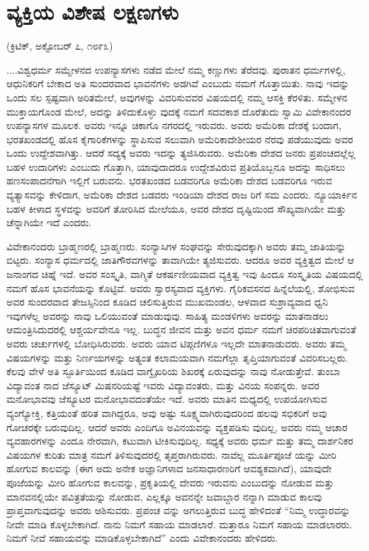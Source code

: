 \delimiter


\section{ವ್ಯಕ್ತಿಯ ವಿಶೇಷ ಲಕ್ಷಣಗಳು}

\begin{center}
(ಕ್ರಿಟಿಕ್​, ಅಕ್ಟೋಬರ್​ ೭, ೧೮೯೩)
\end{center}

....ವಿಶ್ವಧರ್ಮ ಸಮ್ಮೇಳನದ ಉಪನ್ಯಾಸಗಳು ನಡೆದ ಮೇಲೆ ನಮ್ಮ ಕಣ್ಣುಗಳು ತೆರೆದವು. ಪುರಾತನ ಧರ್ಮಗಳಲ್ಲಿ, ಆಧುನಿಕರಿಗೆ ಬೇಕಾದ ಅತಿ ಸುಂದರವಾದ ಭಾವನೆಗಳು ಅಡಗಿವೆ ಎಂಬುದು ನಮಗೆ ಗೊತ್ತಾಯಿತು. ನಾವು ಇದನ್ನು ಒಂದು ಸಲ ಸ್ಪಷ್ಟವಾಗಿ ಅರಿತಮೇಲೆ, ಅವುಗಳನ್ನು ವಿವರಿಸುವವರ ವಿಷಯದಲ್ಲಿ ನಮ್ಮ ಆಸಕ್ತಿ ಕೆರಳಿತು. ಸಮ್ಮೇಳನ ಮುಕ್ತಾಯಗೊಂಡ ಮೇಲೆ, ಅದನ್ನು ತಿಳಿದುಕೊಳ್ಳು ವುದಕ್ಕೆ ನಮಗೆ ಸದವಕಾಶ ದೊರೆತುದು ಸ್ವಾಮಿ ವಿವೇಕಾನಂದರ ಉಪನ್ಯಾಸಗಳ ಮೂಲಕ. ಅವರು ಇನ್ನೂ ಚಿಕಾಗೊ ನಗರದಲ್ಲಿ ಇರುವರು. ಅವರು ಅಮೆರಿಕಾ ದೇಶಕ್ಕೆ ಬಂದಾಗ, ಭರತಖಂಡದಲ್ಲಿ ಹೊಸ ಕೈಗಾರಿಕೆಗಳನ್ನು ಸ್ಥಾಪಿಸುವ ಸಲುವಾಗಿ ಅಮೆರಿಕಾದೇಶೀಯರ ನೆರವು ಪಡೆಯುವುದು ಅವರ ಒಂದು ಉದ್ದೇಶವಾಗಿತ್ತು. ಆದರೆ ಸದ್ಯಕ್ಕೆ ಅವರು ಇದನ್ನು ತ್ಯಜಿಸಿರುವರು. ಅಮೆರಿಕಾ ದೇಶದ ಜನರು ಪ್ರಪಂಚದಲ್ಲೆಲ್ಲ ಬಹಳ ಉದಾರಿಗಳು ಎಂಬುದು ಗೊತ್ತಾಗಿ, ಯಾವುದಾದರೂ ಉದ್ದೇಶವಿರುವ ಪ್ರತಿಯೊಬ್ಬನೂ ಅದನ್ನು ಸಾಧಿಸಲು ಹಣಸಂಪಾದನೆಗಾಗಿ ಇಲ್ಲಿಗೆ ಬರುವನು. ಭರತಖಂಡದ ಬಡವರಿಗೂ ಅಮೆರಿಕಾ ದೇಶದ ಬಡವರಿಗೂ ಇರುವ ವ್ಯತ್ಯಾಸವನ್ನು ಕೇಳಿದಾಗ, ಅಮೆರಿಕಾ ದೇಶದ ಬಡವರು ಇಂಡಿಯಾ ದೇಶದ ರಾಜ ರಿಗೆ ಸಮ ಎಂದರು. ನ್ಯೂಯಾರ್ಕಿನ ಬಹಳ ಕೀಳಾದ ಸ್ಥಳವನ್ನು ಅವರಿಗೆ ತೋರಿಸಿದ ಮೇಲೆಯೂ, ಅವರ ದೇಶದ ದೃಷ್ಟಿಯಿಂದ ಸೌಖ್ಯವಾಗಿಯೇ ಮತ್ತು ಚೆನ್ನಾಗಿಯೇ ಇದೆ ಎಂದರು.

ವಿವೇಕಾನಂದರು ಬ್ರಾಹ್ಮಣರಲ್ಲಿ ಬ್ರಾಹ್ಮಣರು. ಸಂನ್ಯಾಸಿಗಳ ಸಂಘವನ್ನು ಸೇರುವುದಕ್ಕಾಗಿ ಅವರು ತಮ್ಮ ಜಾತಿಯನ್ನು ಬಿಟ್ಟರು. ಸಂನ್ಯಾಸ ಧರ್ಮದಲ್ಲಿ ಜಾತಿಗೌರವಗಳನ್ನು ತಾವಾಗಿಯೇ ತ್ಯಜಿಸುವರು. ಆದರೂ ಅವರ ವ್ಯಕ್ತಿತ್ವದ ಮೇಲೆ ಆ ಜನಾಂಗದ ಚಿಹ್ನೆ ಇದೆ. ಅವರ ಸಂಸ್ಕೃತಿ, ವಾಗ್ಮಿತೆ ಆಕರ್ಷಣೀಯವಾದ ವ್ಯಕ್ತಿತ್ವ ಇವು ಹಿಂದೂ ಸಂಸ್ಕೃತಿಯ ವಿಷಯದಲ್ಲಿ ನಮಗೆ ಹೊಸ ಭಾವನೆಯನ್ನು ಕೊಟ್ಟಿವೆ. ಅವರು ಸ್ವಾರಸ್ಯವಾದ ವ್ಯಕ್ತಿಗಳು. ಗೈರಿಕವಸನದ ಹಿನ್ನೆಲೆಯಲ್ಲಿ, ಶೋಭಿಸುವ ಅವರ ಸುಂದರವಾದ ತೇಜಸ್ಸಿನಿಂದ ಕೂಡಿದ ಚಲಿಸುತ್ತಿರುವ ಮುಖಮಂಡಲ, ಆಳವಾದ ಸುಶ್ರಾವ್ಯವಾದ ಧ್ವನಿ ಇವುಗಳೆಲ್ಲ ಅವರನ್ನು ನಾವು ಒಲಿಯುವಂತೆ ಮಾಡುವುವು. ಸಾಹಿತ್ಯ ಮಂಡಳಿಗಳು ಅವರನ್ನು ಮಾತನಾಡಲು ಆಮಂತ್ರಿಸಿದುದರಲ್ಲಿ ಆಶ್ಚರ್ಯವೇನೂ ಇಲ್ಲ. ಬುದ್ಧನ ಜೀವನ ಮತ್ತು ಅವನ ಧರ್ಮ ನಮಗೆ ಚಿರಪರಿಚಿತವಾಗುವಂತೆ ಅವರು ಚರ್ಚುಗಳಲ್ಲಿ ಬೋಧಿಸಿರುವರು. ಅವರು ಯಾವ ಟಿಪ್ಪಣಿಗಳೂ ಇಲ್ಲದೇ ಮಾತನಾಡುವರು. ಅವರು ತಮ್ಮ ವಿಷಯಗಳನ್ನು ಮತ್ತು ನಿರ್ಣಯಗಳನ್ನು ಅತ್ಯಂತ ಕಲಾಮಯವಾಗಿ ನಮಗೆಲ್ಲಾ ತೃಪ್ತಿಯಾಗುವಂತೆ ವಿವರಿಸಬಲ್ಲರು. ಕೆಲವು ವೇಳೆ ಅತಿ ಸ್ಫೂರ್ತಿಯಿಂದ ಕೂಡಿದ ವಾಗ್ವೈಖರಿಯ ಶಿಖರಕ್ಕೆ ಏರುವುದನ್ನು ನಾವು ನೋಡುತ್ತೇವೆ. ತುಂಬಾ ವಿದ್ಯಾವಂತ ನಾದ ಜೆಸ್ಯೂಟ್​ ಮಿಷನರಿಯಷ್ಟೆ ಇವರು ವಿದ್ಯಾವಂತರು, ಮತ್ತು ವಿನಯ ಸಂಪನ್ನರು. ಅವರ ಮನೋಭಾವವು ಜೆಸ್ಯೂಟರ ಮನೋಭಾವದಂತೆಯೇ ಇದೆ. ಅವರು ಮಾತಿನ ಮಧ್ಯದಲ್ಲಿ ಉಪಯೋಗಿಸುವ ವ್ಯಂಗ್ಯೋಕ್ತಿ, ಕತ್ತಿಯಂತೆ ಹರಿತ ವಾಗಿದ್ದರೂ, ಅವು ಅಷ್ಟು ಸೂಕ್ಷ್ಮವಾಗಿರುವುದರಿಂದ ಹಲವು ಸಭಿಕರಿಗೆ ಅವು ಗೋಚರಕ್ಕೇ ಬರುವುದಿಲ್ಲ. ಆದರೆ ಅವರು ಎಂದಿಗೂ ಅವಿನಯವನ್ನು ವ್ಯಕ್ತಪಡಿಸು ವುದಿಲ್ಲ, ಅವರು ನಮ್ಮ ಆಚಾರ ವ್ಯವಹಾರಗಳನ್ನು ಎಂದೂ ನೇರವಾಗಿ, ಕಟುವಾಗಿ ಟೀಕಿಸುವುದಿಲ್ಲ. ಸಧ್ಯಕ್ಕೆ ಅವರು ಧರ್ಮ ಮತ್ತು ತಮ್ಮ ದಾರ್ಶನಿಕರ ವಿಷಯಗಳ ಕುರಿತು ಮಾತ್ರ ನಮಗೆ ತಿಳಿಸುವುದರಲ್ಲಿ ತೃಪ್ತರಾಗಿರುವರು. ನಾವೆಲ್ಲ ಮೂರ್ತಿಪೂಜೆ ಯನ್ನು ಮೀರಿ ಹೋಗುವ ಕಾಲವನ್ನು (ಈಗ ಅದು ಅನೇಕ ಅಜ್ಞಾನಿಗಳಾದ ಜನಸಾಧಾರಣರಿಗೆ ಆವಶ್ಯಕವಾಗಿದೆ), ಯಾವುದೇ ಪೂಜೆಯನ್ನು ಮೀರಿ ಹೋಗುವ ಕಾಲವನ್ನು, ಪ್ರಕೃತಿಯಲ್ಲಿ ದೇವರು ಇರುವನು ಎಂಬುದನ್ನು ನೋಡುವ ಮತ್ತು ಮಾನವನಲ್ಲಿಯೇ ಪವಿತ್ರತೆಯನ್ನು ನೋಡುವ, ಎಲ್ಲಕ್ಕೂ ಅವನನ್ನೇ ಜವಾಬ್ದಾರ ನನ್ನಾಗಿ ಮಾಡುವ ಕಾಲವು ಪ್ರಾಪ್ತವಾಗುವುದನ್ನು ಅವರು ಆಶಿಸುವರು. ಪ್ರಪಂಚ ವನ್ನು ಅಗಲುತ್ತಿರುವ ಬುದ್ಧ ಹೇಳಿದಂತೆ “ನಿಮ್ಮ ಉದ್ಧಾರವನ್ನು ನೀವೇ ಮಾಡಿ ಕೊಳ್ಳಬೇಕಾಗಿದೆ. ನಾನು ನಿಮಗೆ ಸಹಾಯ ಮಾಡಲಾರೆ. ಮತ್ತಾರೂ ನಿಮಗೆ ಸಹಾಯ ಮಾಡಲಾರರು. ನಿಮಗೆ ನೀವೆ ಸಹಾಯವನ್ನು ಮಾಡಿಕೊಳ್ಳಬೇಕಾಗಿದೆ” ಎಂದು ವಿವೇಕಾನಂದರು ಹೇಳಿದರು.

